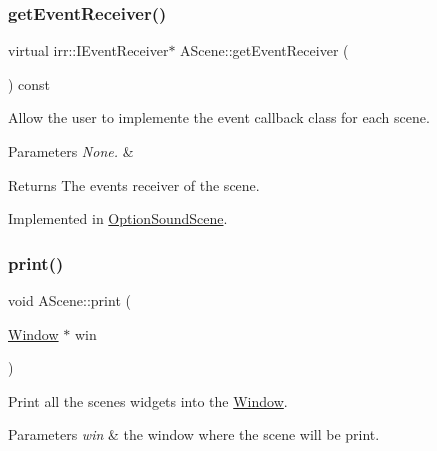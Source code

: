 \subsubsection{\texorpdfstring{get\+Event\+Receiver()}{getEventReceiver()}}
{\footnotesize\ttfamily virtual irr\+::\+I\+Event\+Receiver$\ast$ A\+Scene\+::get\+Event\+Receiver (\begin{DoxyParamCaption}{ }\end{DoxyParamCaption}) const\hspace{0.3cm}{\ttfamily [pure virtual]}}



Allow the user to implemente the event callback class for each scene. 


\begin{DoxyParams}{Parameters}
{\em None.} & \\
\hline
\end{DoxyParams}
\begin{DoxyReturn}{Returns}
The events\textquotesingle{} receiver of the scene. 
\end{DoxyReturn}


Implemented in \hyperlink{classOptionSoundScene_ac71da65763f0db4b05fc32444308b677}{Option\+Sound\+Scene}.

\mbox{\label{classAScene_ae5d7463a823ed64f3846b5847340b68c}} 
\subsubsection{\texorpdfstring{print()}{print()}}
{\footnotesize\ttfamily void A\+Scene\+::print (\begin{DoxyParamCaption}\item[{\hyperlink{classWindow}{Window} $\ast$}]{win }\end{DoxyParamCaption})}



Print all the scene\textquotesingle{}s widgets into the \hyperlink{classWindow}{Window}. 


\begin{DoxyParams}{Parameters}
{\em \textquotesingle{}win\textquotesingle{}} & the window where the scene will be print. \\
\hline
\end{DoxyParams}
\mbox{\label{classAScene_a59f0acef6ed02a578062decd0f907773}} 
